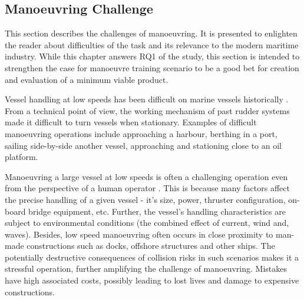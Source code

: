 %
%
%

\subsection{Manoeuvring Challenge}
This section describes the challenges of manoeuvring. It is presented to enlighten the reader about difficulties of the task and its relevance to the modern maritime industry. While this chapter answers RQ1 of the study, this section is intended to strengthen the case for manoeuvre training scenario to be a good bet for creation and evaluation of a minimum viable product.


Vessel handling at low speeds has been difficult on marine vessels historically \parencite{brittanica:ship}. From a technical point of view, the working mechanism of past rudder systems made it difficult to turn vessels when stationary. Examples of difficult manoeuvring operations include approaching a harbour, berthing in a port, sailing side-by-side another vessel, approaching and stationing close to an oil platform. 


Manoeuvring a large vessel at low speeds is often a challenging operation even from the perspective of a human operator \parencite{inoue2000evaluation}. This is because many factors affect the precise handling of a given vessel - it's size, power, thruster configuration, on-board bridge equipment, etc. Further, the vessel's handling characteristics are subject to environmental conditions (the combined effect of current, wind and, waves). Besides, low speed manoeuvring often occurs in close proximity to man-made constructions such as docks, offshore structures and other ships. The potentially destructive consequences of collision risks in such scenarios makes it a stressful operation, further amplifying the challenge of manoeuvring. Mistakes have high associated costs, possibly leading to lost lives and damage to expensive constructions.

